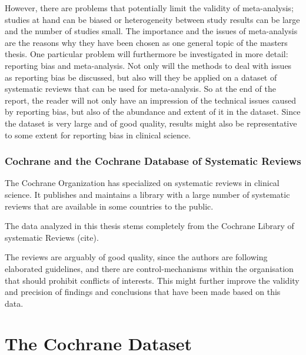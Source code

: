 \documentclass[11pt,a4paper,twoside]{book}\usepackage[]{graphicx}\usepackage[]{color}
\begin{document}
\vspace{0mm}
However, there are problems that potentially limit the validity of meta-analysis; studies at hand can be biased or heterogeneity between study results can be large and the number of studies small. The importance and the issues of meta-analysis are the reasons why they have been chosen as one general topic of the masters thesis. One particular problem will furthermore be investigated in more detail: reporting bias and meta-analysis. Not only will the methods to deal with issues as reporting bias be discussed, but also will they be applied on a dataset of systematic reviews that can be used for meta-analysis. So at the end of the report, the reader will not only have an impression of the technical issues caused by reporting bias, but also of the abundance and extent of it in the dataset. Since the dataset is very large and of good quality, results might also be representative to some extent for reporting bias in clinical science.


\subsection{Cochrane and the Cochrane Database of Systematic Reviews}
The Cochrane Organization has specialized on systematic reviews in clinical science. It publishes and maintains a library with a large number of systematic reviews that are available in some countries to the public.

\vspace{0mm}
The data analyzed in this thesis stems completely from the Cochrane Library of systematic Reviews (cite). 

\vspace{0mm}
The reviews are arguably of good quality, since the authors are following elaborated guidelines, and there are control-mechanisms within the organisation that should prohibit conflicts of interests. This might further improve the validity and precision of findings and conclusions that have been made based on this data. 


















\chapter{The Cochrane Dataset} 
\end{document}
